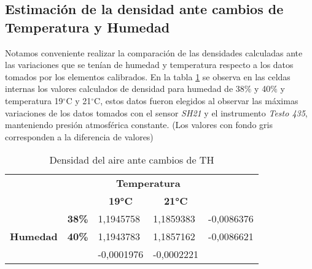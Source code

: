 \subsection{Estimación de la densidad ante cambios de Temperatura y Humedad}
Notamos conveniente realizar la comparación de las densidades calculadas ante las variaciones que se tenían de humedad y temperatura respecto a los datos tomados por los elementos calibrados. En la tabla \ref{densTH} se observa en las celdas internas los valores calculados de densidad para humedad de 38$\%$ y 40$\%$ y temperatura 19$^{\circ}$C y 21$^{\circ}$C, estos datos fueron elegidos al observar las máximas variaciones de los datos tomados con el sensor \textit{SH21} y el instrumento \textit{Testo 435}, manteniendo presión atmosférica constante.
(Los valores con fondo gris corresponden a la diferencia de valores)

\begin{table}[h!]
	\centering
	\begin{tabular}{lllll}
		&  & \multicolumn{2}{c}{\textbf{Temperatura}} &  \\
		&  & \multicolumn{1}{c}{\textbf{19°C}} & \multicolumn{1}{c}{\textbf{21°C}} & \multicolumn{1}{c}{\textbf{}} \\
		\multicolumn{1}{c}{} & \multicolumn{1}{r}{\textbf{38\%}} & 1,1945758 & 1,1859383 & \cellcolor[HTML]{F2F2F2}-0,0086376 \\
		\multicolumn{1}{c}{\multirow{-2}{*}{\textbf{Humedad}}} & \multicolumn{1}{r}{\textbf{40\%}} & 1,1943783 & 1,1857162 & \cellcolor[HTML]{F2F2F2}-0,0086621 \\
		& \multicolumn{1}{c}{\textbf{}} & \cellcolor[HTML]{F2F2F2}-0,0001976 & \cellcolor[HTML]{F2F2F2}-0,0002221 & 
	\end{tabular}
\caption{Densidad del aire ante cambios de TH}
\label{densTH}
\end{table}


